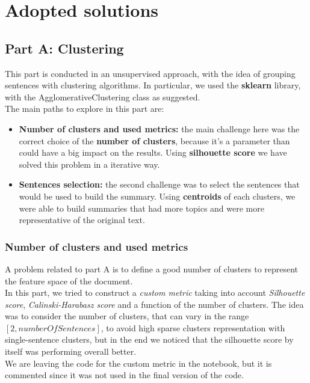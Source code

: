 \section{Adopted solutions}

\subsection*{Part A: Clustering}
This part is conducted in an unsupervised approach, with the idea of grouping
sentences with clustering algorithms. In particular, we used the
\textbf{sklearn} library, with the AgglomerativeClustering class as
suggested.\\ The main paths to explore in this part are:
\begin{itemize}
  \item \textbf{Number of clusters and used metrics: }  the main challenge here was the correct choice of the \textbf{number of clusters}, because it's a parameter than could have a big impact on the results. Using \textbf{silhouette score } we have solved this problem in a iterative way.
  \item \textbf{Sentences selection: } the second challenge was to select the sentences that would be used to build the summary. Using \textbf{centroids} of each clusters, we were able to build summaries that had more topics and were more representative of the original text.
\end{itemize}


\subsubsection*{Number of clusters and used metrics}
A problem related to part A is to define a good number of clusters to represent the feature space of the document.\\
In this part, we tried to construct a \textit{custom metric} taking into account \textit{Silhouette score}, \textit{Calinski-Harabasz score} and a function of the number of clusters. The idea was to consider the number of clusters, that can vary in the range $[2,numberOfSentences]$, to avoid high sparse clusters representation with single-sentence clusters,
but in the end we noticed that the silhouette score by itself was performing overall better.\\We are leaving the code for the custom metric in the notebook, but it is commented since it was not used in the final version of the code.\\

